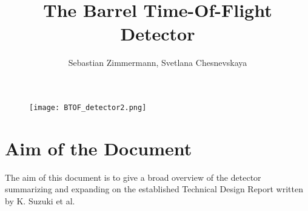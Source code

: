 \documentclass[12pt,a4paper,oneside]{article}
\author{Sebastian Zimmermann, Svetlana Chesnevskaya}
\title{The Barrel Time-Of-Flight Detector}
\begin{document}
\maketitle

\begin{figure}[h]
	\centering
	\texttt{[image: BTOF\_detector2.png]}
\end{figure}

\section*{Aim of the Document}
The aim of this document is to give a broad overview of the detector summarizing and expanding on the established Technical Design Report written by K. Suzuki et al.

\newpage
\tableofcontents
\newpage





\newpage

\newpage

\newpage

\newpage

\newpage

\newpage


\newpage




\end{document}
